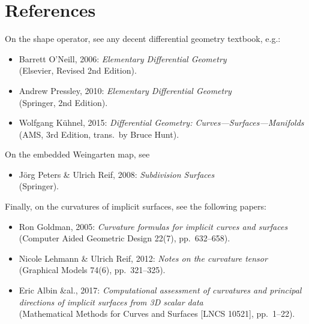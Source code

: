 \documentclass[a4paper]{article}
\begin{document}
\section*{References}
On the shape operator, see any decent differential geometry textbook, e.g.:
\begin{itemize}
\item Barrett O'Neill, 2006:
  \emph{Elementary Differential Geometry}\\
  (Elsevier, Revised 2nd Edition).
\item Andrew Pressley, 2010:
  \emph{Elementary Differential Geometry}\\
  (Springer, 2nd Edition).
\item Wolfgang K\"uhnel, 2015:
  \emph{Differential Geometry: Curves---Surfaces---Manifolds}\\
  (AMS, 3rd Edition, trans.~by Bruce Hunt).
\end{itemize}
On the embedded Weingarten map, see
\begin{itemize}
\item J\"org Peters \& Ulrich Reif, 2008:
  \emph{Subdivision Surfaces}\\
  (Springer).
\end{itemize}
Finally, on the curvatures of implicit surfaces, see the following papers:
\begin{itemize}
\item Ron Goldman, 2005:
  \emph{Curvature formulas for implicit curves and surfaces}\\
  (Computer Aided Geometric Design 22(7), pp.~632--658).
\item Nicole Lehmann \& Ulrich Reif, 2012:
  \emph{Notes on the curvature tensor}\\
  (Graphical Models 74(6), pp.~321--325).
\item Eric Albin \&al., 2017:
  \emph{Computational assessment of curvatures and principal directions of implicit surfaces from 3D scalar data}\\
  (Mathematical Methods for Curves and Surfaces [LNCS 10521], pp.~1--22).
\end{itemize}
\end{document}
